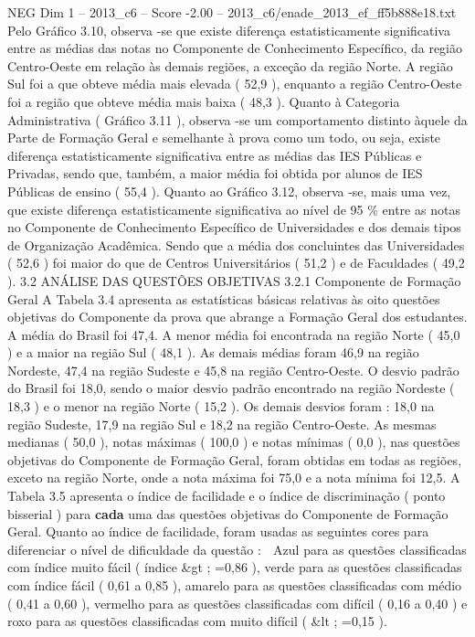 \begin{textsample}{NEG Dim 1 – 2013\_c6 – Score -2.00 – 2013\_c6/enade\_2013\_ef\_ff5b888e18.txt}
Pelo Gráfico 3.10, observa -se que existe diferença estatisticamente significativa entre as médias das notas no Componente de Conhecimento Específico, da região Centro-Oeste em relação às demais regiões, a exceção da região Norte.
A região Sul foi a que obteve média mais elevada ( 52,9 ), enquanto a região Centro-Oeste foi a região que obteve média mais baixa ( 48,3 ).
Quanto à Categoria Administrativa ( Gráfico 3.11 ), observa -se um comportamento distinto àquele da Parte de Formação Geral e semelhante à prova como um todo, ou seja, existe diferença estatisticamente significativa entre as médias das IES Públicas e Privadas, sendo que, também, a maior média foi obtida por alunos de IES Públicas de ensino ( 55,4 ).
Quanto ao Gráfico 3.12, observa -se, mais uma vez, que existe diferença estatisticamente significativa ao nível de 95 \% entre as notas no Componente de Conhecimento Específico de Universidades e dos demais tipos de Organização Acadêmica.
Sendo que a média dos concluintes das Universidades ( 52,6 ) foi maior do que de Centros Universitários ( 51,2 ) e de Faculdades ( 49,2 ). 3.2 ANÁLISE DAS QUESTÕES OBJETIVAS 3.2.1 Componente de Formação Geral A Tabela 3.4 apresenta as estatísticas básicas relativas às oito questões objetivas do Componente da prova que abrange a Formação Geral dos estudantes.
A média do Brasil foi 47,4.
A menor média foi encontrada na região Norte ( 45,0 ) e a maior na região Sul ( 48,1 ).
As demais médias foram 46,9 na região Nordeste, 47,4 na região Sudeste e 45,8 na região Centro-Oeste.
O desvio padrão do Brasil foi 18,0, sendo o maior desvio padrão encontrado na região Nordeste ( 18,3 ) e o menor na região Norte ( 15,2 ).
Os demais desvios foram : 18,0 na região Sudeste, 17,9 na região Sul e 18,2 na região Centro-Oeste.
As mesmas medianas ( 50,0 ), notas máximas ( 100,0 ) e notas mínimas ( 0,0 ), nas questões objetivas do Componente de Formação Geral, foram obtidas em todas as regiões, exceto na região Norte, onde a nota máxima foi 75,0 e a nota mínima foi 12,5.
A Tabela 3.5 apresenta o índice de facilidade e o índice de discriminação ( ponto bisserial ) para \textbf{cada} uma das questões objetivas do Componente de Formação Geral.
Quanto ao índice de facilidade, foram usadas as seguintes cores para diferenciar o nível de dificuldade da questão :  Azul para as questões classificadas com índice muito fácil ( índice \&gt ; =0,86 ), verde para as questões classificadas com índice fácil ( 0,61 a 0,85 ), amarelo para as questões classificadas com médio ( 0,41 a 0,60 ), vermelho para as questões classificadas com difícil ( 0,16 a 0,40 ) e roxo para as questões classificadas com muito difícil ( \&lt ; =0,15 ).

\end{textsample}
